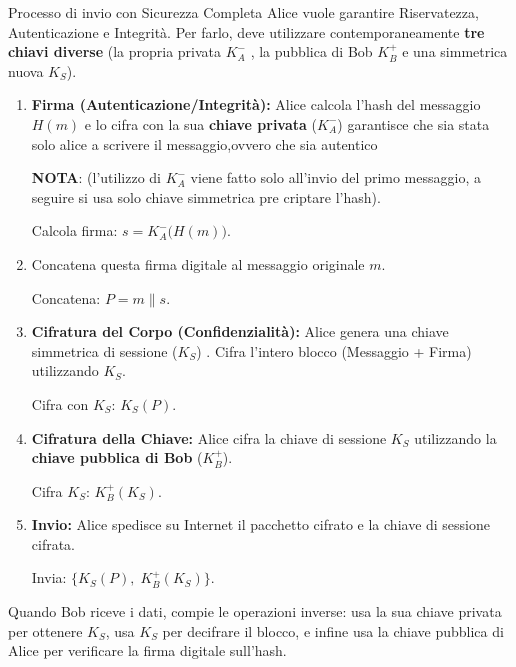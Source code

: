 \documentclass[a4paper,12pt]{report}
\newcommand{\KAm}{K_A^-} %
\newcommand{\KBp}{K_B^+} %
\begin{document}
\begin{esempiobox}{Processo di invio con Sicurezza Completa}
Alice vuole garantire Riservatezza, Autenticazione e Integrità. Per farlo, deve utilizzare contemporaneamente \textbf{tre chiavi diverse} (la propria privata $\KAm$ , la pubblica di Bob  $\KBp$ e una simmetrica nuova $K_S$).

\begin{enumerate}
    \item \textbf{Firma (Autenticazione/Integrità):} Alice calcola l'hash del messaggio $H(m)$ e lo cifra con la sua \textbf{chiave privata} ($K_A^-$) garantisce che sia stata solo alice a scrivere  il messaggio,ovvero che sia autentico 
    
    \textbf{NOTA}: (l'utilizzo di $K_{A}^-$ viene fatto solo all'invio del primo messaggio, a seguire si usa solo chiave simmetrica pre criptare l'hash).

    \begin{center}
         Calcola firma: $s = \KAm\!\bigl(H(m)\bigr)$.
    \end{center}

    \item Concatena questa firma digitale al messaggio originale $m$.
\begin{center}
    Concatena: $P = m \| s$.
\end{center}
    \vspace{0.5cm}

    
    \item \textbf{Cifratura del Corpo (Confidenzialità):} Alice genera una chiave simmetrica di sessione ($K_S$) . Cifra l'intero blocco (Messaggio + Firma) utilizzando $K_S$.

    \begin{center}
        Cifra con $K_S$: $K_S(P)$.
    \end{center}
    \item \textbf{Cifratura della Chiave:} Alice cifra la chiave di sessione $K_S$ utilizzando la \textbf{chiave pubblica di Bob} ($K_B^+$).

    \begin{center}
        Cifra $K_S$: $\KBp(K_S)$.
    \end{center}
    \item \textbf{Invio:} Alice spedisce su Internet il pacchetto cifrato e la chiave di sessione cifrata.

    \begin{center}
        Invia: $\bigl\{K_S(P),\;\KBp(K_S)\bigr\}$.
    \end{center}
\end{enumerate}


Quando Bob riceve i dati, compie le operazioni inverse: usa la sua chiave privata per ottenere $K_S$, usa $K_S$ per decifrare il blocco, e infine usa la chiave pubblica di Alice per verificare la firma digitale sull'hash.
\end{esempiobox}
\end{document}
